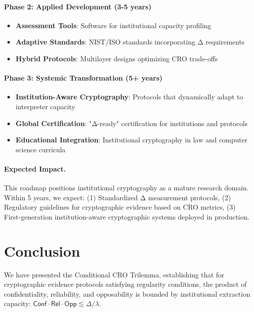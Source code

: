 \documentclass{ieeeaccess}
\newcommand{\Conf}{\mathsf{Conf}}
\newcommand{\Rel}{\mathsf{Rel}}
\newcommand{\Opp}{\mathsf{Opp}}
\begin{document}
\paragraph{Phase 2: Applied Development (3-5 years)}
\begin{itemize}
\item \textbf{Assessment Tools}: Software for institutional capacity profiling
\item \textbf{Adaptive Standards}: NIST/ISO standards incorporating Δ requirements
\item \textbf{Hybrid Protocols}: Multilayer designs optimizing CRO trade-offs
\end{itemize}

\paragraph{Phase 3: Systemic Transformation (5+ years)}
\begin{itemize}
\item \textbf{Institution-Aware Cryptography}: Protocols that dynamically adapt to interpreter capacity
\item \textbf{Global Certification}: "Δ-ready" certification for institutions and protocols
\item \textbf{Educational Integration}: Institutional cryptography in law and computer science curricula
\end{itemize}

\paragraph{Expected Impact.} This roadmap positions institutional cryptography as a mature research domain. Within 5 years, we expect: (1) Standardized Δ measurement protocols, (2) Regulatory guidelines for cryptographic evidence based on CRO metrics, (3) First-generation institution-aware cryptographic systems deployed in production.

\section{Conclusion}\label{sec:conclusion}

We have presented the Conditional CRO Trilemma, establishing that for cryptographic evidence protocols satisfying regularity conditions, the product of confidentiality, reliability, and opposability is bounded by institutional extraction capacity: $\Conf \cdot \Rel \cdot \Opp \lesssim \Delta/\lambda$.
\end{document}
